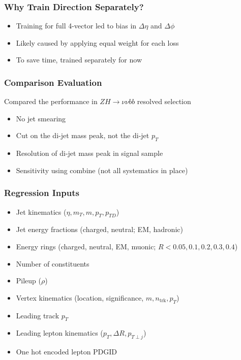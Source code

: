 \documentclass{beamer}
\begin{document}
\begin{frame}
  \frametitle{Why Train Direction Separately?}

  \begin{itemize}
  \item Training for full 4-vector led to bias in
    $\Delta \eta$ and $\Delta \phi$ 
  \item Likely caused by applying equal weight for each loss
  \item To save time, trained separately for now
  \end{itemize}


\end{frame}

\begin{frame}
  \frametitle{Comparison Evaluation}

  Compared the performance in $ZH \rightarrow \nu\nu bb$ resolved selection

  \begin{itemize}
  \item No jet smearing
  \item Cut on the di-jet mass peak, not the di-jet $p_T$
  \item Resolution of di-jet mass peak in signal sample
  \item Sensitivity using combine (not all systematics in place)
  \end{itemize}

\end{frame}

\begin{frame}
  \frametitle{Regression Inputs}

  \begin{itemize}
  \item Jet kinematics ($\eta, m_T, m, p_T, p_{TD}$)
  \item Jet energy fractions (charged, neutral; EM, hadronic)
  \item Energy rings (charged, neutral, EM, muonic; $R < 0.05, 0.1, 0.2, 0.3, 0.4$)
  \item Number of constituents
  \item Pileup ($\rho$)
  \item Vertex kinematics (location, significance, $m, n_\mathrm{trk}, p_T$)
  \item Leading track $p_T$
  \item Leading lepton kinematics ($p_T, \Delta R, p_{T\perp j}$)
  \item One hot encoded lepton PDGID
  \end{itemize}

\end{frame}
\end{document}
